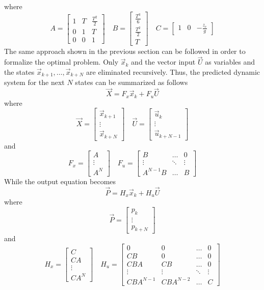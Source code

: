 where
\[
A = \begin{bmatrix}
  1 & T & \frac{T^2}{2}\\
  0 & 1 & T \\
  0 & 0 & 1
\end{bmatrix} \quad
B = \begin{bmatrix}
  \frac{T^3}{6}\\
  \frac{T^2}{2}\\
  T
\end{bmatrix}\quad
C =  \begin{bmatrix}
    1 & 0 & -\frac{z_c}{g}
  \end{bmatrix}
\]
The same approach shown in the previous section can be followed in order to formalize the optimal
problem.
Only $\vec{x}_k$ and the vector
input $\vec{U}$ as variables and the states $\vec{x}_{k + 1}, \dots, \vec{x}_{k + N}$ are eliminated recursively.
Thus, the predicted dynamic system for the next $N$ states can be summarized as follows
\[
\vec{X} = F_{x} \vec{x}_k + F_{u} \vec{U}
\]
where
\[
\vec{X} =
\begin{bmatrix}
  \vec{x}_{k+1}\\
  \vdots\\
  \vec{x}_{k+N}
\end{bmatrix} \quad
\vec{U} =
\begin{bmatrix}
  \vec{u}_{k}\\
  \vdots\\
  \vec{u}_{k+N-1}
\end{bmatrix}
\]
and
\[
F_{x} =
\begin{bmatrix}
  A\\
  \vdots\\
  A^N
\end{bmatrix} \quad
F_u =
\begin{bmatrix}
  B & \hdots & 0\\
  \vdots &\ddots & \vdots\\
  A^{N-1} B & \hdots & B
\end{bmatrix}
\]
While the output equation becomes
\[
\vec{P} = H_{x} \vec{x}_k + H_{u} \vec{U}
\]
where
\[
\vec{P} =
\begin{bmatrix}
  p_{k}\\
  \vdots\\
  p_{k+N}
\end{bmatrix}
\]
and
\[
H_{x} =
\begin{bmatrix}
  C \\
  CA \\
  \vdots\\
  C A^{N}
\end{bmatrix} \quad
H_u =
\begin{bmatrix}
  0 & 0 & \hdots & 0\\
  CB & 0 & \hdots &  0 \\
  CBA & CB & \hdots &  0 \\
  \vdots & \vdots & \ddots & \vdots \\ 
    CBA^{N-1} & CBA^{N-2} & \hdots &  C 
\end{bmatrix}
\]
